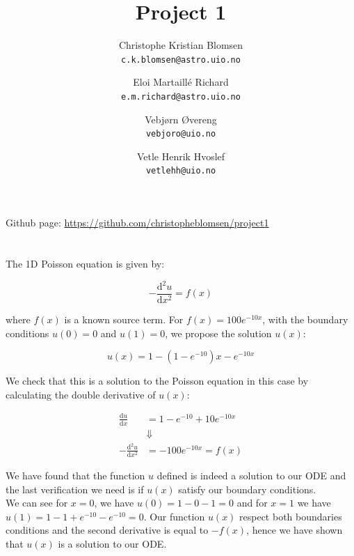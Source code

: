 \documentclass[a4paper,10pt,english]{article}
\author{Christophe Kristian Blomsen\\
			\texttt{c.k.blomsen@astro.uio.no}
			\and
			Eloi Martaillé Richard\\
			\texttt{e.m.richard@astro.uio.no}
			\and
			Vebjørn Øvereng\\
			\texttt{vebjoro@uio.no}
			\and
			Vetle Henrik Hvoslef\\
			\texttt{vetlehh@uio.no}}
\title{Project 1}
\newcommand{\dd}[1]{\mathrm{d}#1}
\begin{document}
			\begin{titlepage}
				\maketitle
				\tableofcontents
				
			\end{titlepage}
			
			
			Github page: \url{https://github.com/christopheblomsen/project1}
			
			\section{} %
			
			The 1D Poisson equation is given by:
			
			\begin{equation}
				-\frac{\dd{^2u}}{\dd{x^2}} = f(x)
			\end{equation}
			
			where $f(x)$ is a known source term.
			For $f(x) = 100e^{-10x}$, with the boundary conditions $u(0) = 0$ and $u(1) = 0$, we propose the solution $u(x)$:
			
			\begin{equation}
				u(x) = 1 - (1 - e^{-10})x - e^{-10x}
			\end{equation}
			
			We check that this is a solution to the Poisson equation in this case by calculating the double derivative of $u(x)$:
			
			\begin{align*}
				\frac{\dd{u}}{\dd{x}} &= 1 - e^{-10} +10 e^{-10x} \\
				&\Downarrow\\
				-\frac{\dd{^2u}}{\dd{x}^2} &= -100e^{-10x} = f(x)
			\end{align*}
			
			We have found that the function $u$ defined is indeed a solution to our ODE and
			the last verification we need is if $u(x)$ satisfy our boundary conditions. \\
			
			We can see for $x=0$, we have $u(0)= 1 - 0 -1 =0$ and for $x=1$ we have
			$u(1) = 1 - 1 + e^{-10} - e^{-10} = 0$. Our function $u(x)$ respect both
			boundaries conditions and the second derivative is equal to $-f(x)$, hence we
			have shown that $u(x)$ is a solution to our ODE.
			
\end{document}
